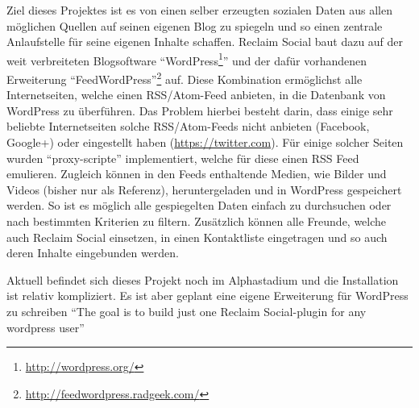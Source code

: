 Ziel dieses Projektes ist es von einen selber erzeugten sozialen Daten aus allen möglichen Quellen auf seinen eigenen Blog zu spiegeln und so einen zentrale Anlaufstelle für seine eigenen Inhalte schaffen. Reclaim Social baut dazu auf der weit verbreiteten Blogsoftware \enquote{WordPress\footnote{\url{http://wordpress.org/}}} und der dafür vorhandenen Erweiterung \enquote{FeedWordPress}\footnote{\url{http://feedwordpress.radgeek.com/}} auf. Diese Kombination ermöglichst alle Internetseiten, welche einen RSS/Atom-Feed anbieten, in die Datenbank von WordPress zu überführen. Das Problem hierbei besteht darin, dass einige sehr beliebte Internetseiten solche RSS/Atom-Feeds nicht anbieten (Facebook, Google+) oder eingestellt haben (\url{https://twitter.com}). Für einige solcher Seiten wurden \enquote{proxy-scripte}\cite[\enquote{Tech Specs Details}]{Schwenzel2013} implementiert, welche für diese einen RSS Feed emulieren. Zugleich können in den Feeds enthaltende Medien, wie Bilder und Videos (bisher nur als Referenz), heruntergeladen und in WordPress gespeichert werden. So ist es möglich alle gespiegelten Daten einfach zu durchsuchen oder nach bestimmten Kriterien zu filtern. Zusätzlich können alle Freunde, welche auch Reclaim Social einsetzen, in einen Kontaktliste eingetragen und so auch deren Inhalte eingebunden werden.

Aktuell befindet sich dieses Projekt noch im Alphastadium und die Installation ist relativ kompliziert. Es ist aber geplant eine eigene Erweiterung für WordPress zu schreiben \enquote{The goal is to build just one Reclaim Social-plugin for any wordpress user}\cite[\enquote{How Does It Work}]{Schwenzel2013}



